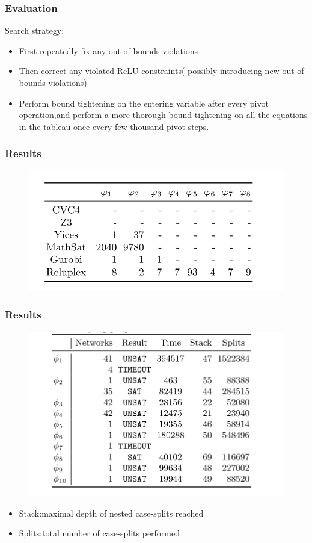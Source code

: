 \documentclass[aspectratio=169%
,serif,mathserif]{beamer}
\begin{document}
\begin{frame}
	\frametitle{Evaluation}
	Search strategy:
	\begin{itemize}
		\item First repeatedly fix any out-of-bounds violations
		\item Then correct any violated ReLU constraints( possibly introducing new out-of-bounds violations) 
		\item Perform bound tightening on the entering variable after every pivot operation,and perform a more thorough bound tightening on all the equations in the tableau once every few thousand pivot steps.
	\end{itemize}

\end{frame}

\begin{frame}
	\frametitle{Results}
	\begin{figure}
		\includegraphics[width=0.75\linewidth]{14.png}
	\end{figure}
\end{frame}

\begin{frame}
	\frametitle{Results}
	\begin{figure}[htbp]
		\includegraphics[width=0.4\linewidth]{15.png}
	\end{figure}

	\begin{itemize}
		\item Stack:maximal depth of nested case-splits reached
		\item Splits:total number of case-splits performed
	\end{itemize}
\end{frame}
\end{document}

